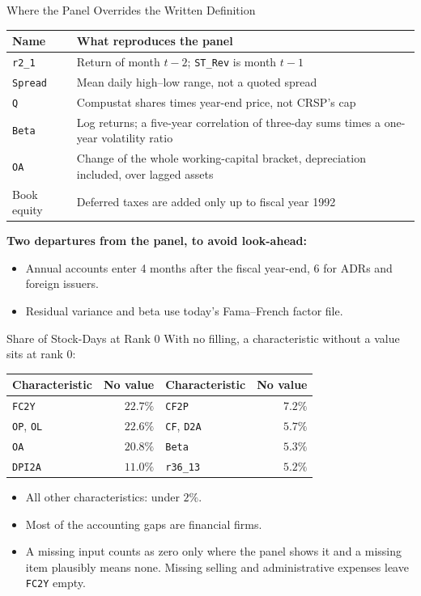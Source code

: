 \documentclass[11pt]{beamer}
\begin{document}
\begin{frame}{Where the Panel Overrides the Written Definition}
\small
\begin{tabular}{@{}l>{\raggedright\arraybackslash}p{}@{}}\toprule
Name & What reproduces the panel\\\midrule
\texttt{r2\_1} & Return of month $t-2$; \texttt{ST\_Rev} is month $t-1$\\[1mm]
\texttt{Spread} & Mean daily high--low range, not a quoted spread\\[1mm]
\texttt{Q} & Compustat shares times year-end price, not CRSP's cap\\[1mm]
\texttt{Beta} & Log returns; a five-year correlation of three-day sums times a one-year volatility ratio\\[1mm]
\texttt{OA} & Change of the whole working-capital bracket, depreciation included, over lagged assets\\[1mm]
Book equity & Deferred taxes are added only up to fiscal year 1992\\\bottomrule
\end{tabular}\par
\medskip
\textbf{Two departures from the panel, to avoid look-ahead:}
\begin{itemize}
\item Annual accounts enter 4 months after the fiscal year-end, 6 for ADRs and foreign issuers.
\item Residual variance and beta use today's Fama--French factor file.
\end{itemize}
\end{frame}

\begin{frame}{Share of Stock-Days at Rank $0$}
\small
With no filling, a characteristic without a value sits at rank $0$:
\begin{center}
\begin{tabular}{@{}lrlr@{}}
\toprule
Characteristic & No value & Characteristic & No value\\
\midrule
\texttt{FC2Y} & $22.7\%$ & \texttt{CF2P} & $7.2\%$\\
\texttt{OP}, \texttt{OL} & $22.6\%$ & \texttt{CF}, \texttt{D2A} & $5.7\%$\\
\texttt{OA} & $20.8\%$ & \texttt{Beta} & $5.3\%$\\
\texttt{DPI2A} & $11.0\%$ & \texttt{r36\_13} & $5.2\%$\\
\bottomrule
\end{tabular}
\end{center}
\begin{itemize}
\item All other characteristics: under $2\%$.
\item Most of the accounting gaps are financial firms.
\item A missing input counts as zero only where the panel shows it and a missing item plausibly
      means none. Missing selling and administrative expenses leave \texttt{FC2Y} empty.
\end{itemize}
\end{frame}
\end{document}
